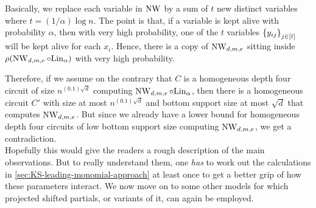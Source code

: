 Basically, we replace each variable in $\operatorname{\mathrm{NW}}$ by a sum of $t$ new distinct variables where $t = (1/\alpha) \log n$. The point is that, if a variable is kept alive with probability $\alpha$, then with very high probability, one of the $t$ variables $\left\{y_{ij}\right\}_{j\in [t]}$ will be kept alive for each $x_i$. Hence, there is a copy of $\operatorname{\mathrm{NW}}_{d,m,e}$ sitting inside $\rho(\operatorname{\mathrm{NW}}_{d,m,e} \circ \mathrm{Lin}_\alpha)$ with very high probability. 

Therefore, if we assume on the contrary that $C$ is a homogeneous depth four circuit of size $n^{(0.1)\sqrt{d}}$ computing $\operatorname{\mathrm{NW}}_{d,m,e} \circ \mathrm{Lin}_\alpha$, then there is a homogeneous circuit $C'$ with size at most $n^{(0.1)\sqrt{d}}$ and bottom support size at most $\sqrt{d}$ that computes $\operatorname{\mathrm{NW}}_{d,m,e}$. But since we already have a lower bound for homogeneous depth four circuits of low bottom support size computing $\operatorname{\mathrm{NW}}_{d,m,e}$, we get a contradiction. \\

Hopefully this would give the readers a rough description of the main observations. But to really understand them, one \emph{has} to work out the calculations in \autoref{sec:KS-leading-monomial-approach} at least once to get a better grip of how these parameters interact. We now move on to some other models for which projected shifted partials, or variants of it, can again be employed. 


